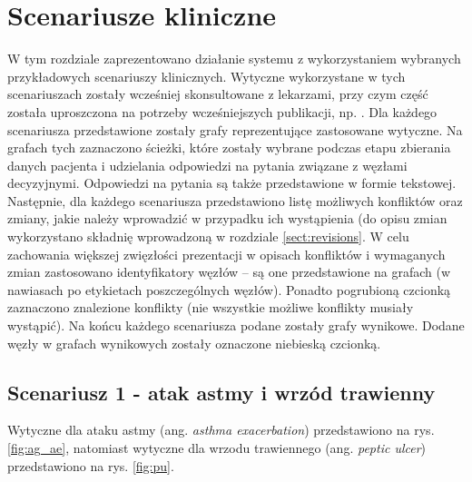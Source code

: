 \chapter{Scenariusze kliniczne}
W tym rozdziale zaprezentowano działanie systemu z wykorzystaniem wybranych przykładowych scenariuszy klinicznych. Wytyczne wykorzystane w tych scenariuszach zostały wcześniej skonsultowane z lekarzami, przy czym część została uproszczona na potrzeby wcześniejszych publikacji, np. \citep{SzWilk,SzWilk2}. Dla każdego scenariusza przedstawione zostały grafy reprezentujące zastosowane wytyczne. Na grafach tych zaznaczono ścieżki, które zostały wybrane podczas etapu zbierania danych pacjenta i udzielania odpowiedzi na pytania związane z węzłami decyzyjnymi. Odpowiedzi na pytania są także przedstawione w formie tekstowej. Następnie, dla każdego scenariusza przedstawiono listę możliwych konfliktów oraz zmiany, jakie należy wprowadzić w przypadku ich wystąpienia (do opisu zmian wykorzystano składnię wprowadzoną w rozdziale \ref{sect:revisions}. W celu zachowania większej zwięzłości prezentacji w opisach konfliktów i wymaganych zmian zastosowano identyfikatory węzłów -- są one przedstawione na grafach (w nawiasach po etykietach poszczególnych węzłów). Ponadto pogrubioną czcionką zaznaczono znalezione konflikty (nie wszystkie możliwe konflikty musiały wystąpić). Na końcu każdego scenariusza podane zostały grafy wynikowe. Dodane węzły w grafach wynikowych zostały oznaczone niebieską czcionką.

\section{Scenariusz 1 - atak astmy i wrzód trawienny}
Wytyczne dla ataku astmy (ang. \textit{asthma exacerbation}) przedstawiono na rys. \ref{fig:ag_ae}, natomiast wytyczne dla wrzodu trawiennego (ang. \textit{peptic ulcer}) przedstawiono na rys. \ref{fig:pu}.

